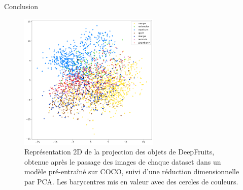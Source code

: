 \begin{subsectionframemod}{Conclusion}
    \begin{figure}[!t]
        \centering
        \includegraphics[width=0.6\textwidth]{Figures/deepfruits.png}
        \caption{Représentation 2D de la projection des objets de DeepFruits, obtenue après le passage des images de chaque dataset dans un modèle pré-entraîné sur COCO, suivi d'une réduction dimensionnelle par PCA. Les barycentres mis en valeur avec des cercles de couleurs.}
        \label{fig:deepfruits}
    \end{figure}
\end{subsectionframemod}


